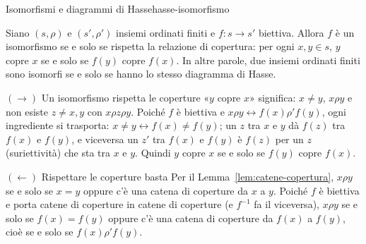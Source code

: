 \begin{concetto}
\begin{Teorema}{Isomorfismi e diagrammi di Hasse}{hasse-isomorfismo}
    \begin{prerequisiti}
    \end{prerequisiti}
    Siano $(s, \rho)$ e $(s', \rho')$ insiemi ordinati finiti e $f \colon s \to s'$ biettiva. Allora $f$ è un isomorfismo se e solo se rispetta la
    relazione di copertura: per ogni $x, y \in s$, $y$ copre $x$ se e solo se $f(y)$ copre $f(x)$. In altre parole, due insiemi ordinati finiti
    sono isomorfi se e solo se hanno lo stesso diagramma di Hasse.
\end{Teorema}
\begin{dimostrazione}
    \begin{caso}{$(\rightarrow)$ Un isomorfismo rispetta le coperture}
        «$y$ copre $x$» significa: $x \neq y$, $x \rho y$ e non esiste $z \neq x, y$ con $x \rho z \rho y$. Poiché $f$ è biettiva e $x \rho y \leftrightarrow f(x) \rho' f(y)$, ogni
        ingrediente si trasporta: $x \neq y \leftrightarrow f(x) \neq f(y)$; un $z$ tra $x$ e $y$ dà $f(z)$ tra $f(x)$ e $f(y)$, e viceversa un $z'$ tra $f(x)$ e $f(y)$
        è $f(z)$ per un $z$ (suriettività) che sta tra $x$ e $y$. Quindi $y$ copre $x$ se e solo se $f(y)$ copre $f(x)$.
    \end{caso}
    \begin{caso}{$(\leftarrow)$ Rispettare le coperture basta}
        Per il Lemma~\ref{lem:catene-copertura}, $x \rho y$ se e solo se $x = y$ oppure c'è una catena di coperture da $x$ a $y$. Poiché $f$ è biettiva e
        porta catene di coperture in catene di coperture (e $f^{-1}$ fa il viceversa), $x \rho y$ se e solo se $f(x) = f(y)$ oppure c'è una catena di
        coperture da $f(x)$ a $f(y)$, cioè se e solo se $f(x) \rho' f(y)$.
    \end{caso}
\end{dimostrazione}
\end{concetto}

